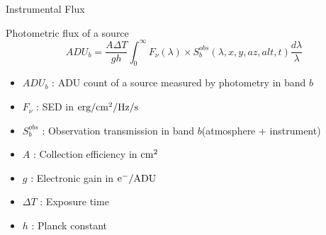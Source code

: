 \documentclass{beamer}
\begin{document}
\begin{frame}{Instrumental Flux}
\begin{alertblock}{Photometric flux of a source}
	\begin{equation}
	ADU_b = \frac{A\Delta T}{gh}\int_0^\infty F_\nu(\lambda) \times S_b^{obs}(\lambda,x,y,az,alt,t) \frac{d\lambda}{\lambda}
	\end{equation}
	\begin{itemize}
	\item $ADU_b$ : ADU count of a source measured by photometry in band $b$
	\item $F_\nu$ : SED in ${\rm erg/cm^2/Hz/s}$
	\item $S_b^{obs}$ : Observation transmission in band $b$(atmosphere + instrument)
	\item $A$ : Collection efficiency in ${\rm cm^2}$
	\item $g$ : Electronic gain in ${\rm e^-/ADU}$
	\item $\Delta T$ : Exposure time
	\item $h$ : Planck constant
	\end{itemize}
	\end{alertblock}	
\end{frame}
\end{document}
